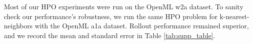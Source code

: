  Most of our HPO experiments were run on the OpenML w2a dataset. To sanity check our performance's robustness, we run the same HPO problem for k-nearest-neighbors with the OpenML a1a dataset. Rollout performance remained superior, and we record the mean and standard error in Table \ref{tab:supp_table}.  
 
